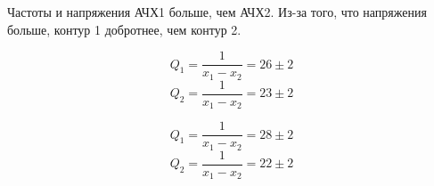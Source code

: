 Частоты и напряжения АЧХ1 больше, чем АЧХ2. Из-за того, что напряжения больше, контур 1 добротнее, чем контур 2.

\begin{figure}[ht!]
\end{figure}

\[
    Q_{1} = \frac{1}{x_{1} - x_{2}} = 26 \pm 2
\]
\[
    Q_{2} = \frac{1}{x_{1} - x_{2}} = 23\pm 2 
\]

\begin{figure}[ht!]
\end{figure}

\[
    Q_{1} = \frac{1}{x_{1}-x_{2}} = 28\pm 2
\]
\[
    Q_{2} = \frac{1}{x_{1}-x_{2}} = 22\pm 2
\]

\begin{figure}[ht!]
\end{figure}

